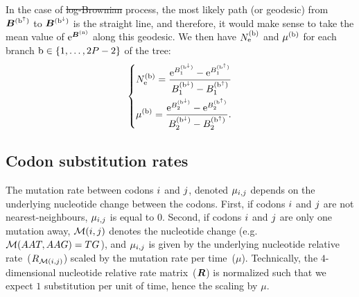 \documentclass{article}
\providecommand{\DIFaddtex}[1]{{\protect\color{blue}\uwave{#1}}} %
\providecommand{\DIFdeltex}[1]{{\protect\color{red}\sout{#1}}}                      %
\providecommand{\DIFaddbegin}{} %
\providecommand{\DIFaddend}{} %
\providecommand{\DIFdelbegin}{} %
\providecommand{\DIFdelend}{} %
\providecommand{\DIFadd}[1]{\texorpdfstring{\DIFaddtex{#1}}{#1}} %
\providecommand{\DIFdel}[1]{\texorpdfstring{\DIFdeltex{#1}}{}} %
\begin{document}
    In the case of \DIFdelbegin \DIFdel{log-Brownian }\DIFdelend \DIFaddbegin \DIFadd{geometric Brownian }\DIFaddend process, the most likely path (or geodesic) from $\bm{B}^{(\text{b}^{\uparrow})}$ to $\bm{B}^{(\text{b}^{\downarrow})}$ is the straight line, and therefore, it would make sense to take the mean value of $\text{e}^{\bm{B}^{(\text{n})}}$ along this geodesic.
    We then have $N_{\text{e}}^{(\text{b})}$ and $\mu^{(\text{b})}$ for each branch $\text{b} \in \{1, \hdots, 2 P - 2\}$ of the tree:
    \begin{equation}
        \label{eq:branchNemu}
        \begin{dcases}
            N_{\text{e}}^{(\text{b})} = \dfrac{\text{e}^{B_{1}^{(\text{b}^{\downarrow})}} - \text{e}^{B_{1}^{(\text{b}^{\uparrow})}}}{B_{1}^{(\text{b}^{\downarrow})} - B_{1}^{(\text{b}^{\uparrow})}} \\
            \mu^{(\text{b})} = \dfrac{\text{e}^{B_{2}^{(\text{b}^{\downarrow})}} - \text{e}^{B_{2}^{(\text{b}^{\uparrow})}}}{B_{2}^{(\text{b}^{\downarrow})} - B_{2}^{(\text{b}^{\uparrow})}}.
        \end{dcases}
    \end{equation}

    \subsection{Codon substitution rates}

    The mutation rate between codons ${i}$ and ${j}$, denoted $\mu_{{i}, {j}}$ depends on the underlying nucleotide change between the codons.
    First, if codons ${i}$ and ${j}$ are not nearest-neighbours, $\mu_{{i}, {j}}$ is equal to $0$.
    Second, if codons ${i}$ and ${j}$ are only one mutation away, $\mathcal{M}({i}, {j})$ denotes the nucleotide change (e.g.~$\mathcal{M}(AAT, AAG) = TG$), and $\mu_{{i}, {j}}$ is given by the underlying nucleotide relative rate~(${R_{\mathcal{M}({i}, {j})}}$) scaled by the mutation rate per time~($\mu$).
    Technically, the $4$-dimensional nucleotide relative rate matrix~($\bm{R}$) is normalized such that we expect $1$ {substitution} per unit of time, hence the scaling by $\mu$.
\end{document}
